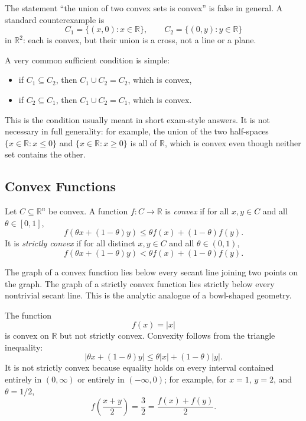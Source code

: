 \begin{remark}
	The statement ``the union of two convex sets is convex'' is false in general. A standard counterexample is
	\[
		C_1 = \{(x,0) : x \in \mathbb{R}\},
		\qquad
		C_2 = \{(0,y) : y \in \mathbb{R}\}
	\]
	in $\mathbb{R}^2$: each is convex, but their union is a cross, not a line or a plane.

	A very common sufficient condition is simple:
	\begin{itemize}
		\item if $C_1 \subseteq C_2$, then $C_1 \cup C_2 = C_2$, which is convex,
		\item if $C_2 \subseteq C_1$, then $C_1 \cup C_2 = C_1$, which is convex.
	\end{itemize}
	This is the condition usually meant in short exam-style answers. It is not necessary in full generality: for example, the union of the two half-spaces $\{x \in \mathbb{R} : x \le 0\}$ and $\{x \in \mathbb{R} : x \ge 0\}$ is all of $\mathbb{R}$, which is convex even though neither set contains the other.
\end{remark}

\subsection{Convex Functions}
\label{sec:l1-convex-functions}

\begin{definition}\label{def:l1-convex-and-strictly-convex-functions}
	Let $C \subseteq \mathbb{R}^n$ be convex. A function $f : C \to \mathbb{R}$ is \emph{convex} if for all $x,y \in C$ and all $\theta \in [0,1]$,
	\[
		f(\theta x + (1-\theta)y)
		\le \theta f(x) + (1-\theta) f(y).
	\]
	It is \emph{strictly convex} if for all distinct $x,y \in C$ and all $\theta \in (0,1)$,
	\[
		f(\theta x + (1-\theta)y)
		< \theta f(x) + (1-\theta) f(y).
	\]
\end{definition}

\begin{intuition}
	The graph of a convex function lies below every secant line joining two points on the graph. The graph of a strictly convex function lies strictly below every nontrivial secant line. This is the analytic analogue of a bowl-shaped geometry.
\end{intuition}

\begin{eg}
	The function
	\[
		f(x) = |x|
	\]
	is convex on $\mathbb{R}$ but not strictly convex. Convexity follows from the triangle inequality:
	\[
		|\theta x + (1-\theta)y|
		\le \theta |x| + (1-\theta)|y|.
	\]
	It is not strictly convex because equality holds on every interval contained entirely in $(0,\infty)$ or entirely in $(-\infty,0)$; for example, for $x=1$, $y=2$, and $\theta = 1/2$,
	\[
		f\!\left(\frac{x+y}{2}\right) = \frac{3}{2}
		= \frac{f(x)+f(y)}{2}.
	\]
\end{eg}

